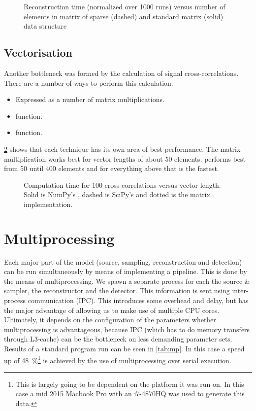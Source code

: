 \documentclass[a4paper, openany, oneside]{memoir}
\begin{document}
\begin{figure}[h]
    \centering
    
    \caption{Reconstruction time (normalized over 1000 runs) versus number of elements in matrix of sparse (dashed) and standard matrix (solid) data structure}
    \label{fig:sparse}
\end{figure}

\subsection{Vectorisation}
\label{sec:vectorisation}
Another bottleneck was formed by the calculation of signal cross-correlations. There are a number of ways to perform this calculation:
\begin{itemize}
    \item Expressed as a number of matrix multiplications.
    \item {}  function.
    \item {}  function.
\end{itemize}
\cref{fig:correlation} shows that each technique has its own area of best performance. The matrix multiplication works best for vector lengths of about 50 elements.   performs best from 50 until 400 elements and for everything above that  is the fastest.

\begin{figure}[h]
    \centering
    
    \caption{Computation time for 100 cross-correlations versus vector length. Solid is NumPy's , dashed is SciPy's  and dotted is the matrix implementation.}
    \label{fig:correlation}
\end{figure}

\section{Multiprocessing}
\label{sec:multiprocessing}

Each major part of the model (source, sampling, reconstruction and detection) can be run simultaneously by means of implementing a pipeline. This is done by the means of multiprocessing. We spawn a separate process for each the source \& sampler, the reconstructor and the detector. This information is sent using inter-process communication (IPC). This introduces some overhead and delay, but has the major advantage of allowing us to make use of multiple CPU cores. Ultimately, it depends on the configuration of the parameters whether multiprocessing is advantageous, because IPC (which has to do memory transfers through L3-cache) can be the bottleneck on less demanding parameter sets. Results of a standard program run can be seen in \cref{tab:mp}. In this case a speed up of \SI{48}{\percent}\footnote{This is largely going to be dependent on the platform it was run on. In this case a mid 2015 Macbook Pro with an i7-4870HQ was used to generate this data.} is achieved by the use of multiprocessing over serial execution.
\end{document}
